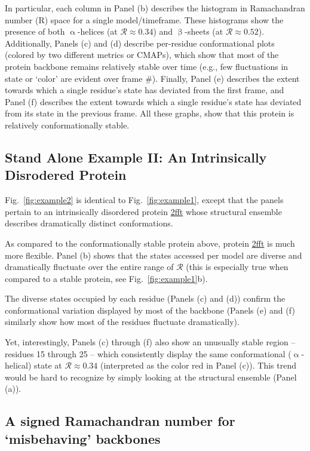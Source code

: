 \documentclass[fleqn,10pt,lineno]{wlpeerj} %
\newcommand{\Fig}[1]{Fig.~\ref{#1}}
\newcommand{\n}[1]{{\color{red}#1}}
\begin{document}
In particular, each column in Panel (b) describes the histogram in Ramachandran number (R) space for a single model/timeframe. These histograms show the presence of both $\upalpha$-helices (at $\mathcal{R} \approx 0.34$) and $\upbeta$-sheets (at $\mathcal{R} \approx 0.52$). Additionally, Panels (c) and (d) describe per-residue conformational plots (colored by two different metrics or CMAPs), which show that most of the protein backbone remains relatively stable over time (e.g., few fluctuations in state or `color' are evident over frame \#). Finally, Panel (e) describes the extent towards which a single residue's state has deviated from the first frame, and Panel (f) describes the extent towards which a single residue's state has deviated from its state in the previous frame. All these graphs, show that this protein is relatively conformationally stable.

\subsection*{Stand Alone Example II: An Intrinsically Disrodered Protein}

\Fig{fig:example2} is identical to \Fig{fig:example1}, except that the panels pertain to an intrinsically disordered protein \href{https://www.rcsb.org/structure/2FFT}{2fft} whose structural ensemble describes dramatically distinct conformations. 

As compared to the conformationally stable protein above, protein \href{https://www.rcsb.org/structure/2FFT}{2fft} is much more flexible. Panel (b) shows that the states accessed per model are diverse and dramatically fluctuate over the entire range of $\mathcal{R}$ (this is especially true when compared to a stable protein, see \Fig{fig:example1}b). 

The diverse states occupied by each residue (Panels (c) and (d)) confirm the conformational variation displayed by most of the backbone (Panels (e) and (f) similarly show how most of the residues fluctuate dramatically).

Yet, interestingly, Panels (c) through (f) also show an \n{unusually} stable region -- residues 15 through 25 -- which consistently display the same conformational ($\upalpha$-helical) state at $\mathcal{R}\approx0.34$ (interpreted as the color red in Panel (c)). This trend would be hard to recognize by simply looking at the structural ensemble (Panel (a)). 

\subsection*{A signed Ramachandran number for `misbehaving' backbones}
\end{document}
